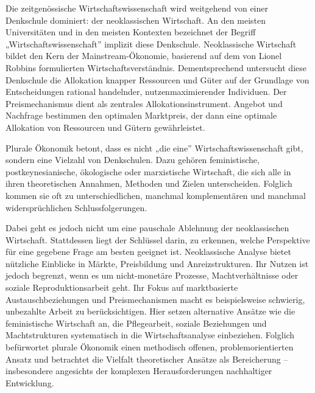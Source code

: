 \documentclass[
  nswissgerman,
  a4paper,
  DIV=11,
  numbers=noendperiod,
  oneside,
  openany]{scrreprt}
\begin{document}
\begin{tcolorbox}[enhanced jigsaw, arc=.35mm, bottomrule=.15mm, bottomtitle=1mm, breakable, colback=white, colbacktitle=quarto-callout-note-color!10!white, colframe=quarto-callout-note-color-frame, coltitle=black, left=2mm, leftrule=.75mm, opacityback=0, opacitybacktitle=0.6, rightrule=.15mm, title={Plurale Ökonomik}, titlerule=0mm, toprule=.15mm, toptitle=1mm]

Die zeitgenössische Wirtschaftswissenschaft wird weitgehend von einer
Denkschule dominiert: der neoklassischen Wirtschaft. An den meisten
Universitäten und in den meisten Kontexten bezeichnet der Begriff
„Wirtschaftswissenschaft'' implizit diese Denkschule. Neoklassische
Wirtschaft bildet den Kern der Mainstream-Ökonomie, basierend auf dem
von Lionel Robbins formulierten Wirtschaftsverständnis. Dementsprechend
untersucht diese Denkschule die Allokation knapper Ressourcen und Güter
auf der Grundlage von Entscheidungen rational handelnder,
nutzenmaximierender Individuen. Der Preismechanismus dient als zentrales
Allokationsinstrument. Angebot und Nachfrage bestimmen den optimalen
Marktpreis, der dann eine optimale Allokation von Ressourcen und Gütern
gewährleistet.

Plurale Ökonomik betont, dass es nicht „die eine''
Wirtschaftswissenschaft gibt, sondern eine Vielzahl von Denkschulen.
Dazu gehören feministische, postkeynesianische, ökologische oder
marxistische Wirtschaft, die sich alle in ihren theoretischen Annahmen,
Methoden und Zielen unterscheiden. Folglich kommen sie oft zu
unterschiedlichen, manchmal komplementären und manchmal
widersprüchlichen Schlussfolgerungen.

Dabei geht es jedoch nicht um eine pauschale Ablehnung der
neoklassischen Wirtschaft. Stattdessen liegt der Schlüssel darin, zu
erkennen, welche Perspektive für eine gegebene Frage am besten geeignet
ist. Neoklassische Analyse bietet nützliche Einblicke in Märkte,
Preisbildung und Anreizstrukturen. Ihr Nutzen ist jedoch begrenzt, wenn
es um nicht-monetäre Prozesse, Machtverhältnisse oder soziale
Reproduktionsarbeit geht. Ihr Fokus auf marktbasierte
Austauschbeziehungen und Preismechanismen macht es beispielsweise
schwierig, unbezahlte Arbeit zu berücksichtigen. Hier setzen alternative
Ansätze wie die feministische Wirtschaft an, die Pflegearbeit, soziale
Beziehungen und Machtstrukturen systematisch in die Wirtschaftsanalyse
einbeziehen. Folglich befürwortet plurale Ökonomik einen methodisch
offenen, problemorientierten Ansatz und betrachtet die Vielfalt
theoretischer Ansätze als Bereicherung -- insbesondere angesichts der
komplexen Herausforderungen nachhaltiger Entwicklung.


\end{tcolorbox}
\end{document}
